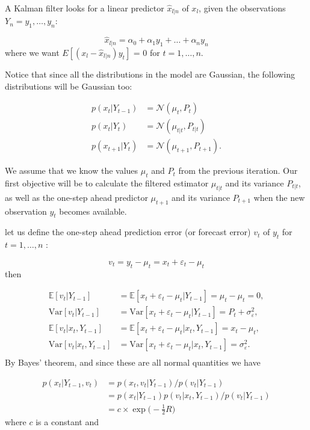 \documentclass[11pt,a4paper]{article}
\newcommand{\E}{\mathbb{E}}
\newcommand{\var}{\mathrm{Var}}
\begin{document}
A Kalman filter looks for a linear predictor $\hat{x}_{l|n}$ of $x_l$, given the observations $Y_n = y_1, \dots, y_n$:

\[
    \hat{x}_{l|n} = \alpha_0 + \alpha_1 y_1 + \dots +\alpha_n y_n
\]
where we want $E[(x_l - \hat{x}_{l|n})y_t]$ = 0 for $t = 1, \dots, n$. 

Notice that since all the distributions in the model are Gaussian, the following distributions will be Gaussian too:

\begin{align*}
    p(x_t| Y_{t-1}) &= \mathcal{N} (\mu_t, P_t)\\
    p(x_t| Y_t) &= \mathcal{N} (\mu_{t|t}, P_{t|t})\\
    p(x_{t+1}|Y_t) &= \mathcal{N} (\mu_{t+1}, P_{t+1}).
\end{align*}

We assume that we know the values $\mu_t$ and $P_t$ from the previous iteration. Our first objective will be to calculate the filtered estimator $\mu_{t|t}$ and its variance $P_{t|t}$, as well as the one-step ahead predictor $\mu_{t+1}$ and its variance $P_{t+1}$ when the new observation $y_t$ becomes available.

let us define the one-step ahead prediction error (or forecast error) $v_t$ of $y_t$ for $t = 1, \dots, n$ :

\[
    v_t = y_t - \mu_t = x_t + \varepsilon_t - \mu_t
\]
then

\begin{align*}
    \E[v_t|Y_{t-1}] &= \E[x_t + \varepsilon_t - \mu_t | Y_{t-1}] = \mu_t - \mu_t = 0,\\
    \var[v_t|Y_{t-1}] &= \var[x_t + \varepsilon_t - \mu_t | Y_{t-1}] = P_t + \sigma^2_\varepsilon,\\
    \E[v_t|x_t, Y_{t-1}] &= \E[x_t + \varepsilon_t - \mu_t |x_t, Y_{t-1}] = x_t - \mu_t,\\
    \var[v_t|x_t, Y_{t-1}] &= \var[x_t + \varepsilon_t - \mu_t |x_t, Y_{t-1}] = \sigma^2_\varepsilon.\\
\end{align*}
By Bayes' theorem, and since these are all normal quantities we have

\begin{align*}
    p(x_t|Y_{t-1},v_t) &= p(x_t, v_t|Y_{t-1})/p(v_t|Y_{t-1})\\
    &= p(x_t|Y_{t-1})p(v_t|x_t,Y_{t-1})/p(v_t|Y_{t-1})\\
    &= c\times \exp\Big(-\frac{1}{2} R\Big)
\end{align*}
where $c$ is a constant and
\end{document}
